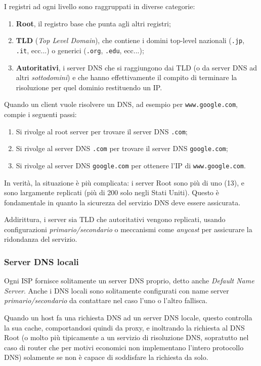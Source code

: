 \documentclass[a4paper,11pt]{article}
\begin{document}
I registri ad ogni livello sono raggruppati in diverse categorie:
\begin{enumerate}
	\item \textbf{Root}, il registro base che punta agli altri registri;
	\item \textbf{TLD} (\textit{Top Level Domain}), che contiene i domini top-level nazionali (\lstinline|.jp|, \lstinline|.it|, ecc...) o generici (\lstinline|.org|, \lstinline|.edu|, ecc...);
	\item \textbf{Autoritativi}, i server DNS che si raggiungono dai TLD (o da server DNS ad altri \textit{sottodomini}) e che hanno effettivamente il compito di terminare la risoluzione per quel dominio restituendo un IP.
\end{enumerate}

Quando un client vuole risolvere un DNS, ad esempio per \lstinline|www.google.com|, compie i seguenti passi:
\begin{enumerate}
	\item Si rivolge al root server per trovare il server DNS \lstinline|.com|;
	\item Si rivolge al server DNS \lstinline|.com| per trovare il server DNS \lstinline|google.com|;
	\item Si rivolge al server DNS \lstinline|google.com| per ottenere l'IP di \lstinline|www.google.com|.
\end{enumerate}

In verità, la situazione è più complicata: i server Root sono più di uno (13), e sono largamente replicati (più di 200 solo negli Stati Uniti). Questo è fondamentale in quanto la sicurezza del servizio DNS deve essere assicurata.

Addirittura, i server sia TLD che autoritativi vengono replicati, usando configurazioni \textit{primario/secondario} o meccanismi come \textit{anycast} per assicurare la ridondanza del servizio.

\subsubsection{Server DNS locali}
Ogni ISP fornisce solitamente un server DNS proprio, detto anche \textit{Default Name Server}.
Anche i DNS locali sono solitamente configurati con name server \textit{primario/secondario} da contattare nel caso l'uno o l'altro fallisca. 

Quando un host fa una richiesta DNS ad un server DNS locale, questo controlla la sua cache, comportandosi quindi da proxy, e inoltrando la richiesta al DNS Root (o molto più tipicamente a un servizio di risoluzione DNS, sopratutto nel caso di router che per motivi economici non implementano l'intero protocollo DNS) solamente se non è capace di soddisfare la richiesta da solo.
\end{document}
